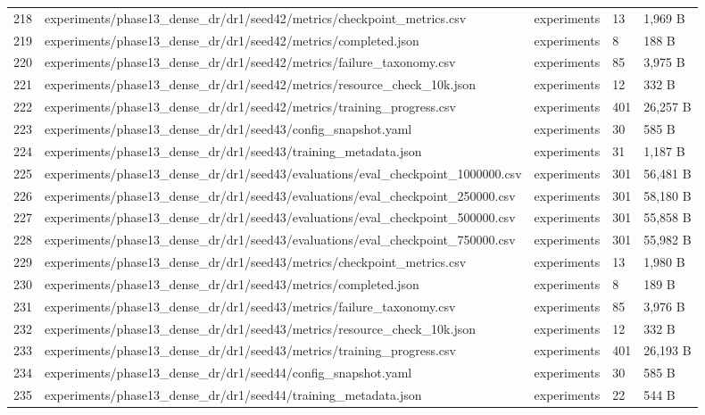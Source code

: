 \documentclass[11pt,a4paper,oneside]{book}
\begin{document}
\begin{longtable}{l l l l l}
218 & experiments/phase13\_dense\_dr/dr1/seed42/metrics/checkpoint\_metrics.csv & experiments & 13 & 1,969 B \\
219 & experiments/phase13\_dense\_dr/dr1/seed42/metrics/completed.json & experiments & 8 & 188 B \\
220 & experiments/phase13\_dense\_dr/dr1/seed42/metrics/failure\_taxonomy.csv & experiments & 85 & 3,975 B \\
221 & experiments/phase13\_dense\_dr/dr1/seed42/metrics/resource\_check\_10k.json & experiments & 12 & 332 B \\
222 & experiments/phase13\_dense\_dr/dr1/seed42/metrics/training\_progress.csv & experiments & 401 & 26,257 B \\
223 & experiments/phase13\_dense\_dr/dr1/seed43/config\_snapshot.yaml & experiments & 30 & 585 B \\
224 & experiments/phase13\_dense\_dr/dr1/seed43/training\_metadata.json & experiments & 31 & 1,187 B \\
225 & experiments/phase13\_dense\_dr/dr1/seed43/evaluations/eval\_checkpoint\_1000000.csv & experiments & 301 & 56,481 B \\
226 & experiments/phase13\_dense\_dr/dr1/seed43/evaluations/eval\_checkpoint\_250000.csv & experiments & 301 & 58,180 B \\
227 & experiments/phase13\_dense\_dr/dr1/seed43/evaluations/eval\_checkpoint\_500000.csv & experiments & 301 & 55,858 B \\
228 & experiments/phase13\_dense\_dr/dr1/seed43/evaluations/eval\_checkpoint\_750000.csv & experiments & 301 & 55,982 B \\
229 & experiments/phase13\_dense\_dr/dr1/seed43/metrics/checkpoint\_metrics.csv & experiments & 13 & 1,980 B \\
230 & experiments/phase13\_dense\_dr/dr1/seed43/metrics/completed.json & experiments & 8 & 189 B \\
231 & experiments/phase13\_dense\_dr/dr1/seed43/metrics/failure\_taxonomy.csv & experiments & 85 & 3,976 B \\
232 & experiments/phase13\_dense\_dr/dr1/seed43/metrics/resource\_check\_10k.json & experiments & 12 & 332 B \\
233 & experiments/phase13\_dense\_dr/dr1/seed43/metrics/training\_progress.csv & experiments & 401 & 26,193 B \\
234 & experiments/phase13\_dense\_dr/dr1/seed44/config\_snapshot.yaml & experiments & 30 & 585 B \\
235 & experiments/phase13\_dense\_dr/dr1/seed44/training\_metadata.json & experiments & 22 & 544 B \\

\end{longtable}
\end{document}
